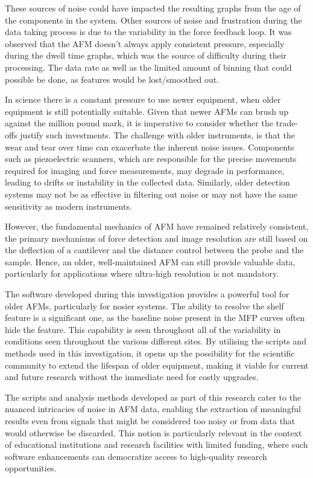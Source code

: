 These sources of noise could have impacted the resulting graphs from the age of the components in the system. Other sources of noise and frustration during the data taking process is due to the variability in the force feedback loop. It was observed that the AFM doesn't always apply consistent pressure, especially during the dwell time graphs, which was the source of difficulty during their processing. The data rate as well as the limited amount of binning that could possible be done, as features would be lost/smoothed out. 

In science there is a constant pressure to use newer equipment, when older equipment is still potentially suitable. Given that newer AFMs can brush up against the million pound mark, it is imperative to consider whether the trade-offs justify such investments. The challenge with older instruments, is that the wear and tear over time can exacerbate the inherent noise issues. Components such as piezoelectric scanners, which are responsible for the precise movements required for imaging and force measurements, may degrade in performance, leading to drifts or instability in the collected data. Similarly, older detection systems may not be as effective in filtering out noise or may not have the same sensitivity as modern instruments.

However, the fundamental mechanics of AFM have remained relatively consistent, the primary mechanisms of force detection and image resolution are still based on the deflection of a cantilever and the distance control between the probe and the sample. Hence, an older, well-maintained AFM can still provide valuable data, particularly for applications where ultra-high resolution is not mandatory.

The software developed during this investigation provides a powerful tool for older AFMs, particularly for nosier systems. The ability to resolve the shelf feature is a significant one, as the baseline noise present in the MFP curves often hide the feature. This capability is seen throughout all of the variability in conditions seen throughout the various different sites. By utilising the scripts and methods used in this investigation, it opens up the possibility for the scientific community to extend the lifespan of older equipment, making it viable for current and future research without the immediate need for costly upgrades.

The scripts and analysis methods developed as part of this research cater to the nuanced intricacies of noise in AFM data, enabling the extraction of meaningful results even from signals that might be considered too noisy or from data that would otherwise be discarded. This notion is particularly relevant in the context of educational institutions and research facilities with limited funding, where such software enhancements can democratize access to high-quality research opportunities. 

